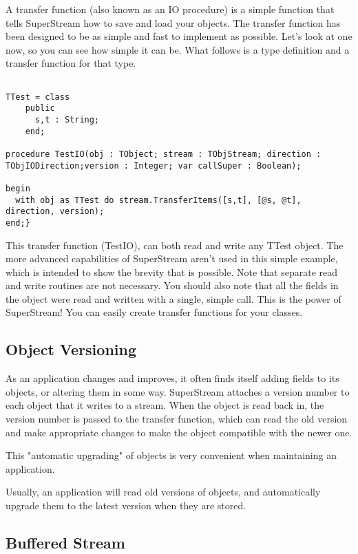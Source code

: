 \documentclass{report}
\begin{document}
A transfer function (also known as an IO procedure) is a simple function
that tells SuperStream how to save and load your objects. The transfer
function has been designed to be as simple and fast to implement as
possible. Let's look at one now, so you can see how simple it can be. What
follows is a type definition and a transfer function for that type.

\begin{lstlisting}

TTest = class
	public
	  s,t : String;
	end;

procedure TestIO(obj : TObject; stream : TObjStream; direction : TObjIODirection;version : Integer; var callSuper : Boolean);

begin
  with obj as TTest do stream.TransferItems([s,t], [@s, @t], direction, version);
end;}
\end{lstlisting}

This transfer function (TestIO), can both read and write any TTest object.
The more advanced capabilities of SuperStream aren't used in this simple
example, which is intended to show the brevity that is possible. Note that
separate read and write routines are not necessary.  You should also note
that all the fields in the object were read and written with a single,
simple call. This is the power of SuperStream! You can easily create
transfer functions for your classes.

\subsection{Object Versioning}

As an application changes and improves, it often finds itself adding fields
to its objects, or altering them in some way. SuperStream attaches a version
number to each object that it writes to a stream. When the object is read
back in, the version number is passed to the transfer function, which can
read the old version and make appropriate changes to make the object
compatible with the newer one.

This "automatic upgrading" of objects is very convenient 
when maintaining an application.

Usually, an application will read old versions of objects, and automatically
upgrade them to the latest version when they are stored.

\subsection{Buffered Stream}
\end{document}
